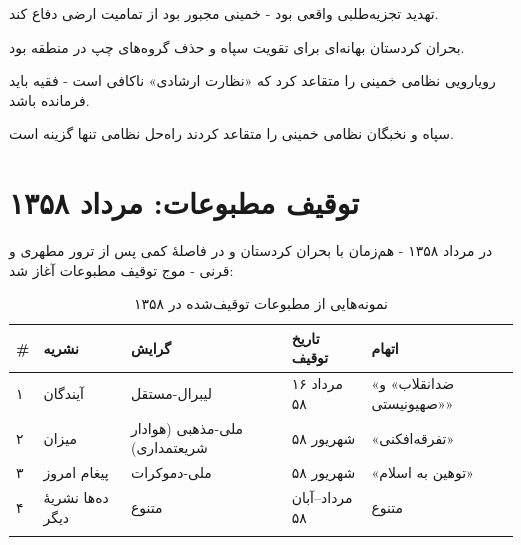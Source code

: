 \documentclass[12pt,a4paper]{book}
\begin{document}
\begin{warningBox}
\begin{description}[style=nextline, font=\bfseries\color{cPrimary}]
    \item[تز ۱:] تهدید تجزیه‌طلبی واقعی بود - خمینی مجبور بود از تمامیت ارضی دفاع کند.
    \item[تز ۲:] بحران کردستان بهانه‌ای برای تقویت سپاه و حذف گروه‌های چپ در منطقه بود.
    \item[تز ۳:] رویارویی نظامی خمینی را متقاعد کرد که «نظارت ارشادی» ناکافی است - فقیه باید فرمانده باشد.
    \item[تز ۴:] سپاه و نخبگان نظامی خمینی را متقاعد کردند راه‌حل نظامی تنها گزینه است.
\end{description}
\end{warningBox}

\section{توقیف مطبوعات: مرداد ۱۳۵۸}

در مرداد ۱۳۵۸ - هم‌زمان با بحران کردستان و در فاصلهٔ کمی پس از ترور مطهری و قرنی - موج توقیف مطبوعات آغاز شد:

\begin{longtable}{%
    >{\centering\arraybackslash}p{}
    >{\raggedleft\arraybackslash}p{}
    >{\raggedleft\arraybackslash}p{}
    >{\raggedleft\arraybackslash}p{}
    >{\raggedleft\arraybackslash}p{}}
\toprule
\rowcolor{cPrimary!10}
\textbf{\#} & \textbf{نشریه} & \textbf{گرایش} & \textbf{تاریخ توقیف} & \textbf{اتهام} \\
\midrule
\endhead

۱ & آیندگان & لیبرال-مستقل & ۱۶ مرداد ۵۸ & «ضدانقلاب» و «صهیونیستی» \\
\midrule

۲ & میزان & ملی-مذهبی (هوادار شریعتمداری) & شهریور ۵۸ & «تفرقه‌افکنی» \\
\midrule

۳ & پیغام امروز & ملی-دموکرات & شهریور ۵۸ & «توهین به اسلام» \\
\midrule

۴ & ده‌ها نشریهٔ دیگر & متنوع & مرداد–آبان ۵۸ & متنوع \\

\bottomrule
\caption{نمونه‌هایی از مطبوعات توقیف‌شده در ۱۳۵۸}
\label{tab:press-closures}
\end{longtable}
\end{document}
